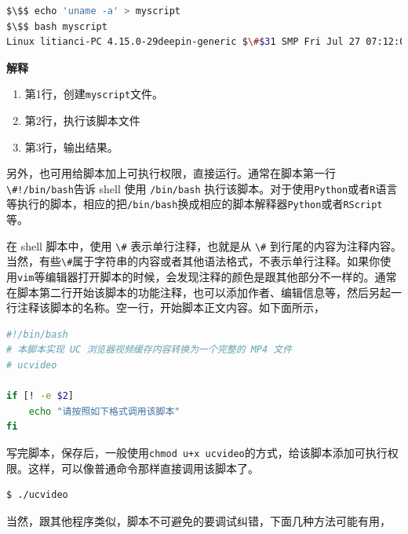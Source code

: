\documentclass[doctor,openright,twoside]{sjtuthesis}
\providecommand{\tightlist}{%
    \setlength{\itemsep}{0pt}\setlength{\parskip}{0pt}}
\newcommand{\passthrough}[1]{#1}
\theoremstyle{plain}
\theoremstyle{definition}
\theoremstyle{remark}
\theoremstyle{ocrenumbox}
\theoremstyle{plain}
\begin{document}
\begin{lstlisting}[language=bash]
$\$$ echo 'uname -a' > myscript
$\$$ bash myscript 
Linux litianci-PC 4.15.0-29deepin-generic $\#$31 SMP Fri Jul 27 07:12:08 UTC 2018 x86_64 GNU/Linux
\end{lstlisting}

\lstset{mathescape=false}

\textbf{解释}

\begin{enumerate}
\def\labelenumi{\arabic{enumi}.}
\tightlist
\item
  第1行，创建\passthrough{\lstinline!myscript!}文件。
\item
  第2行，执行该脚本文件
\item
  第3行，输出结果。
\end{enumerate}

另外，也可用给脚本加上可执行权限，直接运行。通常在脚本第一行\passthrough{\lstinline"\#!/bin/bash"}告诉 shell 使用 \passthrough{\lstinline!/bin/bash!} 执行该脚本。对于使用\passthrough{\lstinline!Python!}或者\passthrough{\lstinline!R!}语言等执行的脚本，相应的把\passthrough{\lstinline!/bin/bash!}换成相应的脚本解释器\passthrough{\lstinline!Python!}或者\passthrough{\lstinline!RScript!}等。

在 shell 脚本中，使用 \passthrough{\lstinline!\#!} 表示单行注释，也就是从 \passthrough{\lstinline!\#!} 到行尾的内容为注释内容。当然，有些\passthrough{\lstinline!\#!}属于字符串的内容或者其他语法格式，不表示单行注释。如果你使用\passthrough{\lstinline!vim!}等编辑器打开脚本的时候，会发现注释的颜色是跟其他部分不一样的。通常在脚本第二行开始该脚本的功能注释，也可以添加作者、编辑信息等，然后另起一行注释该脚本的名称。空一行，开始脚本正文内容。如下面所示，

\begin{lstlisting}[language=bash]
#!/bin/bash
# 本脚本实现 UC 浏览器视频缓存内容转换为一个完整的 MP4 文件
# ucvideo

if [! -e $2]
    echo "请按照如下格式调用该脚本"
fi
\end{lstlisting}

写完脚本，保存后，一般使用\passthrough{\lstinline!chmod u+x ucvideo!}的方式，给该脚本添加可执行权限。这样，可以像普通命令那样直接调用该脚本了。

\begin{lstlisting}[language=bash]
$ ./ucvideo
\end{lstlisting}

当然，跟其他程序类似，脚本不可避免的要调试纠错，下面几种方法可能有用，
\end{document}
